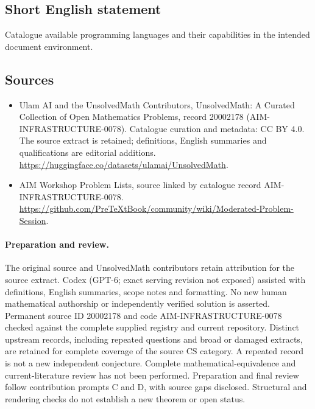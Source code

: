 \documentclass[11pt]{article}
\begin{document}
\subsection{Short English statement}
Catalogue available programming languages and their capabilities in the intended document environment.
\subsection{Sources}
\begin{itemize}
\item[\hypertarget{source:20002178:1}{S1}] Ulam AI and the UnsolvedMath Contributors, UnsolvedMath: A Curated Collection of Open Mathematics Problems, record 20002178 (AIM-INFRASTRUCTURE-0078). Catalogue curation and metadata: CC BY 4.0. The source extract is retained; definitions, English summaries and qualifications are editorial additions.
\url{https://huggingface.co/datasets/ulamai/UnsolvedMath}.
\item[\hypertarget{source:20002178:2}{S2}] AIM Workshop Problem Lists, source linked by catalogue record AIM-INFRASTRUCTURE-0078.
\url{https://github.com/PreTeXtBook/community/wiki/Moderated-Problem-Session}.
\end{itemize}
\paragraph{Preparation and review.}
The original source and UnsolvedMath contributors retain attribution for the source extract. Codex (GPT-6; exact serving revision not exposed) assisted with definitions, English summaries, scope notes and formatting. No new human mathematical authorship or independently verified solution is asserted. Permanent source ID 20002178 and code AIM-INFRASTRUCTURE-0078 checked against the complete supplied registry and current repository. Distinct upstream records, including repeated questions and broad or damaged extracts, are retained for complete coverage of the source CS category. A repeated record is not a new independent conjecture. Complete mathematical-equivalence and current-literature review has not been performed. Preparation and final review follow contribution prompts C and D, with source gaps disclosed. Structural and rendering checks do not establish a new theorem or open status.
\label{end:20002178}
\end{document}
